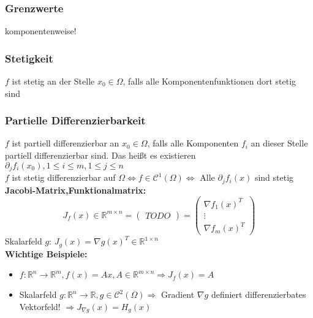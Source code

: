 \documentclass[german]{latex4ei/latex4ei_sheet}
\begin{document}
\subsubsection*{Grenzwerte}
komponentenweise!

\subsubsection*{Stetigkeit}
$f$ ist stetig an der Stelle $x_0 \in \Omega$, falls alle Komponentenfunktionen dort stetig sind

\subsubsection*{Partielle Differenzierbarkeit}
$f$ ist partiell differenzierbar an $x_0 \in \Omega$, falls alle Komponenten $f_i$ an dieser Stelle partiell differenzierbar sind. Das hei\ss{}t es existieren $\partial_j f_i(x_0), 1 \le i \le m, 1 \le j \le n$\\
$f$ ist stetig differenzierbar auf $\Omega \Leftrightarrow f \in \mathcal{C}^1(\Omega) \Leftrightarrow $ Alle $\partial_j f_i (x)$ sind stetig\\
\textbf{Jacobi-Matrix,Funktionalmatrix:} \[J_f(x) \in \mathbb{R}^{m \times n}=\begin{pmatrix} TODO \end{pmatrix}=\begin{pmatrix} \nabla f_1(x)^T \\ \vdots \\ \nabla f_m(x)^T \end{pmatrix} \]
Skalarfeld $g$: $J_g (x)=\nabla g(x)^T \in \mathbb{R}^{1 \times n}$\\
\textbf{Wichtige Beispiele:}
\begin{itemize}
\item $f: \mathbb{R}^n \rightarrow \mathbb{R}^m, f(x)=A x, A \in \mathbb{R}^{m\times n} \Rightarrow J_f(x)=A$
\item Skalarfeld $g: \mathbb{R}^n \rightarrow \mathbb{R}, g \in \mathcal{C}^2(\Omega) \Rightarrow$ Gradient $\nabla g$ definiert differenzierbates Vektorfeld! $\Rightarrow J_{\nabla g}(x)= H_g(x)$
\end{itemize}
\end{document}
